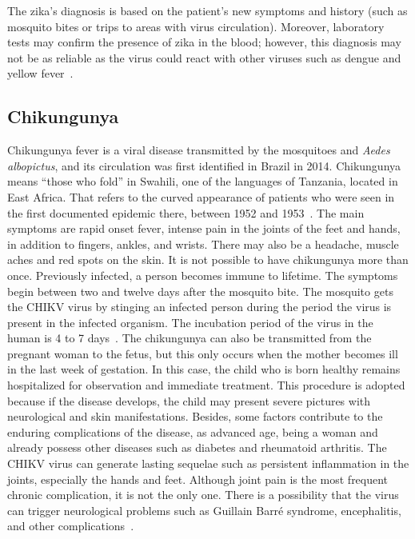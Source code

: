 The zika's diagnosis is based on the patient's new symptoms and history (such as mosquito bites or trips to areas with virus circulation).
Moreover, laboratory tests may confirm the presence of zika in the blood; however, this diagnosis may not be as reliable as the virus could react with other viruses such as dengue and yellow fever~\cite{PAHO2017zika}.

\subsection{Chikungunya}
Chikungunya fever is a viral disease transmitted by the mosquitoes \Aedes and \textit{Aedes albopictus}, and its circulation was first identified in Brazil in 2014.
Chikungunya means ``those who fold'' in Swahili, one of the languages of Tanzania, located in East Africa.
That refers to the curved appearance of patients who were seen in the first documented epidemic there, between 1952 and 1953~\cite{staples2009chikungunya}.
The main symptoms are rapid onset fever, intense pain in the joints of the feet and hands, in addition to fingers, ankles, and wrists.
There may also be a headache, muscle aches and red spots on the skin.
It is not possible to have chikungunya more than once.
Previously infected, a person becomes immune to lifetime.
The symptoms begin between two and twelve days after the mosquito bite.
The mosquito gets the CHIKV virus by stinging an infected person during the period the virus is present in the infected organism.
The incubation period of the virus in the human is 4 to 7 days~\cite{staples2009chikungunya}.
The chikungunya can also be transmitted from the pregnant woman to the fetus, but this only occurs when the mother becomes ill in the last week of gestation.
In this case, the child who is born healthy remains hospitalized for observation and immediate treatment. This procedure is adopted because if the disease develops, the child may present severe pictures with neurological and skin manifestations.
Besides, some factors contribute to the enduring complications of the disease, as advanced age, being a woman and already possess other diseases such as diabetes and rheumatoid arthritis.
The CHIKV virus can generate lasting sequelae such as persistent inflammation in the joints, especially the hands and feet.
Although joint pain is the most frequent chronic complication, it is not the only one.
There is a possibility that the virus can trigger neurological problems such as Guillain Barré syndrome, encephalitis, and other complications~\cite{web:who2017chik}.

